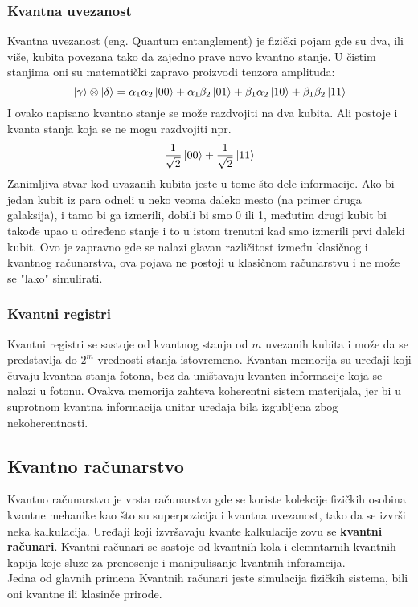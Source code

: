 \documentclass[12pt, letterpaper, oneside]{article}
\begin{document}
\subsubsection*{Kvantna uvezanost}
Kvantna uvezanost (eng. Quantum entanglement) je fizički pojam gde su dva, ili više, kubita povezana tako da zajedno prave novo kvantno stanje.
U čistim stanjima oni su matematički zapravo proizvodi tenzora amplituda:
\[
    \ket{\gamma} \otimes \ket{\delta} = \alpha_1\alpha_2\ket{00} + \alpha_1\beta_2\ket{01} + \beta_1\alpha_2\ket{10} + \beta_1\beta_2\ket{11}
\]
I ovako napisano kvantno stanje se može razdvojiti na dva kubita. Ali postoje i kvanta stanja koja se ne mogu razdvojiti npr.
\[
 \frac{1}{\sqrt{2}}\ket{00} + \frac{1}{\sqrt{2}}\ket{11}
\]
Zanimljiva stvar kod uvazanih kubita jeste u tome što dele informacije. Ako bi jedan kubit iz para odneli u neko veoma daleko mesto (na primer druga galaksija),
i tamo bi ga izmerili, dobili bi smo 0 ili 1, međutim drugi kubit bi takođe upao u određeno stanje i to u istom trenutni kad smo izmerili prvi daleki kubit. Ovo je zapravno gde se nalazi glavan različitost između klasičnog i kvantnog računarstva, ova pojava ne postoji u klasičnom računarstvu i ne može se "lako" simulirati.
\subsubsection*{Kvantni registri}
Kvantni registri se sastoje od kvantnog stanja od $m$ uvezanih kubita i može da se predstavlja do $2^m$ vrednosti stanja istovremeno.
Kvantan memorija su uređaji koji čuvaju kvantna stanja fotona, bez da uništavaju kvanten informacije koja se nalazi u fotonu.
Ovakva memorija zahteva koherentni sistem materijala, jer bi u suprotnom kvantna informacija unitar uređaja bila izgubljena zbog nekoherentnosti.

\subsection{Kvantno računarstvo}
Kvantno računarstvo je vrsta računarstva gde se koriste kolekcije fizičkih osobina kvantne mehanike kao što su superpozicija i kvantna uvezanost,
tako da se izvrši neka kalkulacija. Uređaji koji izvršavaju kvante kalkulacije zovu se \textbf{kvantni računari}.
Kvantni računari se sastoje od kvantnih kola i elemntarnih kvantnih kapija koje sluze za prenosenje i manipulisanje kvantnih inforamcija.
\cite{nielsen_chuang_10th} \\
Jedna od glavnih primena Kvantnih računari jeste simulacija fizičkih sistema, bili oni kvantne ili klasinče prirode.
\end{document}
